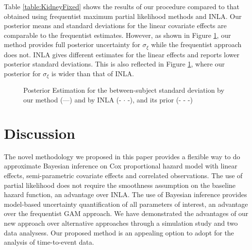 \documentclass[AMA,STIX1COL,doublespace]{WileyNJD-v2}
\begin{document}
Table \ref{table:KidneyFixed} shows the results of our procedure compared to that obtained using frequentist maximum partial likelihood methods and INLA. Our posterior means and standard deviations for the linear covariate effects are comparable to the frequentist estimates. However, as shown in Figure \ref{fig:BetweenSubjectSD}, our method provides full posterior uncertainty for $\sigma_{\xi}$ while the frequentist approach does not. INLA gives different estimates for the linear effects and reports lower posterior standard deviations. This is also reflected in Figure \ref{fig:BetweenSubjectSD}, where our posterior for $\sigma_{\xi}$ is wider than that of INLA.

\begin{figure}[ht]
\centering
{}
\caption{Posterior Estimation for the between-subject standard deviation by our method (---) and by INLA (- $\cdot$ -), and its prior (- - -)}
\label{fig:BetweenSubjectSD}
\end{figure}

\section{Discussion}\label{sec:discussion}

The novel methodology we proposed in this paper provides a flexible way to do approximate Bayesian inference on Cox proportional hazard model with linear effects, semi-parametric covariate effects and correlated observations. The use of  partial likelihood does not require the smoothness assumption on the baseline hazard function, an advantage over INLA. The use of Bayesian inference provides model-based uncertainty quantification of all parameters of interest, an advantage over the frequentist GAM approach. We have demonstrated the advantages of our new approach over alternative approaches through a simulation study and two data analysess. Our proposed method is an appealing option to adopt for the analysis of time-to-event data.
\end{document}
